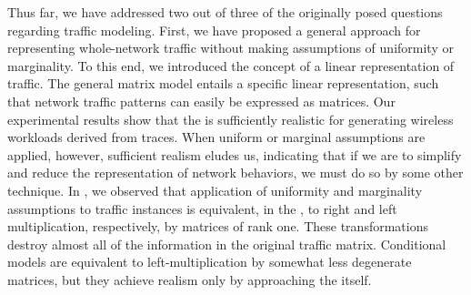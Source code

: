 \documentclass[twocolumn,final]{svjour3}
\begin{document}

Thus far, we have addressed two out of three of the originally posed questions regarding traffic modeling. First, we have proposed a general approach for representing whole-network traffic without making assumptions of uniformity or marginality. To this end, we introduced the concept of a linear representation of traffic. The general matrix model entails a specific linear representation, such that network traffic patterns can easily be expressed as matrices. Our experimental results show that the  is sufficiently realistic for generating wireless workloads derived from traces. When uniform or marginal assumptions are applied, however, sufficient realism eludes us, indicating that if we are to simplify and reduce the representation of network behaviors, we must do so by some other technique. In , we observed that application of uniformity and marginality assumptions to traffic instances is equivalent, in the , to right and left multiplication, respectively, by matrices of rank one. These transformations destroy almost all of the information in the original traffic matrix.
Conditional models are equivalent to left-multiplication by somewhat less degenerate matrices, but they achieve realism only by approaching the  itself.


\end{document}
